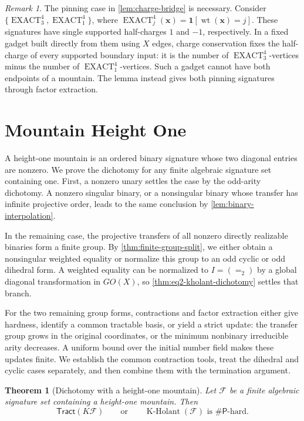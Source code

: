 \documentclass[11pt,letterpaper,onecolumn]{article}
\theoremstyle{plain}
\newtheorem{theorem}{Theorem}[section]
\theoremstyle{definition}
\theoremstyle{remark}
\newtheorem{remark}[remark]{Remark}
\newcommand{\cF}{\mathcal F}
\newcommand{\KHolant}{\operatorname{K\text{-}Holant}}
\newcommand{\Tract}{\mathsf{Tract}}
\newcommand{\SharpP}{\#\mathsf P}
\newcommand{\wt}{\operatorname{wt}}
\newcommand{\Eq}{=}
\newcommand{\one}{\mathbf 1}
\begin{document}
\begin{remark}
The pinning case in \cref{lem:charge-bridge} is necessary.
Consider \(\{\operatorname{EXACT}^4_3,\operatorname{EXACT}^4_1\}\), where
\(\operatorname{EXACT}^4_j({\mathbf x})=\one[\wt({\mathbf x})=j]\).
These signatures have single supported half-charges \(1\) and \(-1\),
respectively.  In a fixed gadget built directly from them using
\(X\) edges, charge conservation fixes the half-charge of every
supported boundary input: it is the number of
\(\operatorname{EXACT}^4_3\)-vertices minus the number of
\(\operatorname{EXACT}^4_1\)-vertices.  Such a gadget cannot have both
endpoints of a mountain.  The lemma instead gives both pinning signatures
through factor extraction.
	\end{remark}
	\section{Mountain Height One}
	\label{sec:binary-dynamics}
	
	A height-one mountain is an ordered binary signature whose two diagonal
	entries are nonzero. We prove the dichotomy for any finite algebraic
	signature set containing one. First, a nonzero unary settles the case by
	the odd-arity dichotomy. A nonzero singular binary, or a nonsingular binary
	whose transfer has infinite projective order, leads to the same conclusion
	by \cref{lem:binary-interpolation}.

	In the remaining case, the projective transfers of all nonzero directly
	realizable binaries form a finite group. By \cref{thm:finite-group-split},
	we either obtain a nonsingular weighted equality or normalize this group
	to an odd cyclic or odd dihedral form. A weighted equality can be
	normalized to \(I=(\Eq_2)\) by a global diagonal transformation in
	\(GO(X)\), so \cref{thm:eq2-kholant-dichotomy} settles that branch.

	For the two remaining group forms, contractions and factor extraction
	either give hardness, identify a common tractable basis, or yield a strict
	update: the transfer group grows in the original coordinates, or the
	minimum nonbinary irreducible arity decreases. A uniform bound over the
	initial number field makes these updates finite. We establish the common
	contraction tools, treat the dihedral and cyclic cases separately, and
	then combine them with the termination argument.

	\begin{theorem}[Dichotomy with a height-one mountain]
		\label{cor:height-one-complete}
		Let \(\cF\) be a finite algebraic signature set containing a height-one
		mountain.  Then
		\[
		\Tract(K\cF)
		\qquad\text{or}\qquad
		\KHolant(\cF)\text{ is }\SharpP\text{-hard}.
		\]
	\end{theorem}
	
\end{document}
